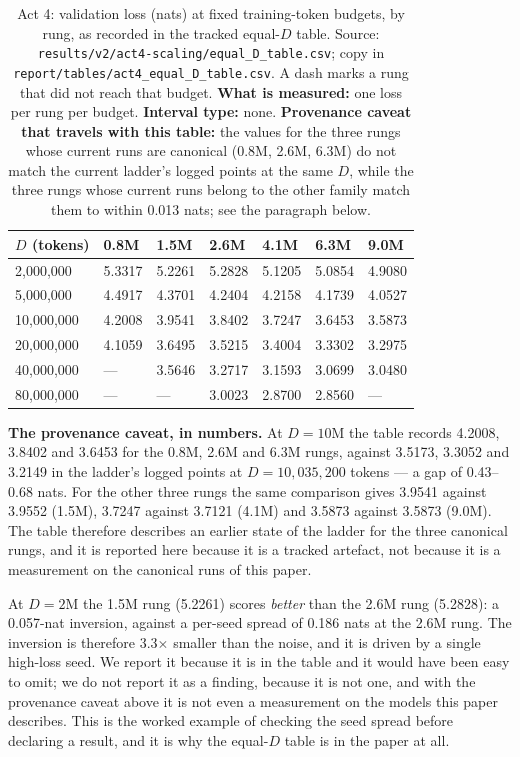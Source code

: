 \documentclass[11pt,a4paper]{article}
\begin{document}
\begin{table}[H]
\centering
\begin{tabular}{L{2.0cm}R{1.8cm}R{1.8cm}R{1.8cm}R{1.8cm}R{1.8cm}R{1.8cm}}
\toprule
$D$ (tokens) & 0.8M & 1.5M & 2.6M & 4.1M & 6.3M & 9.0M \\
,000,000 & 5.3317 & 5.2261 & 5.2828 & 5.1205 & 5.0854 & 4.9080 \\
5,000,000 & 4.4917 & 4.3701 & 4.2404 & 4.2158 & 4.1739 & 4.0527 \\
10,000,000 & 4.2008 & 3.9541 & 3.8402 & 3.7247 & 3.6453 & 3.5873 \\
20,000,000 & 4.1059 & 3.6495 & 3.5215 & 3.4004 & 3.3302 & 3.2975 \\
40,000,000 & --- & 3.5646 & 3.2717 & 3.1593 & 3.0699 & 3.0480 \\
80,000,000 & --- & --- & 3.0023 & 2.8700 & 2.8560 & --- \\
\bottomrule
\end{tabular}
\caption{Act 4: validation loss (nats) at fixed training-token budgets, by rung,
as recorded in the tracked equal-$D$ table. Source:
\texttt{results/v2/act4-scaling/equal\_D\_table.csv}; copy in
\texttt{report/tables/act4\_equal\_D\_table.csv}. A dash marks a rung that did
not reach that budget. \textbf{What is measured:} one loss per rung per
budget. \textbf{Interval type:} none. \textbf{Provenance caveat that travels
with this table:} the values for the three rungs whose current runs are
canonical (0.8M, 2.6M, 6.3M) do not match the current ladder's logged points
at the same $D$, while the three rungs whose current runs belong to the other
family match them to within 0.013 nats; see the paragraph below.}
\label{tab:act4-equalD}
\end{table}

\textbf{The provenance caveat, in numbers.} At $D = 10$M the table records
4.2008, 3.8402 and 3.6453 for the 0.8M, 2.6M and 6.3M rungs, against
3.5173, 3.3052 and 3.2149 in the ladder's logged points at
$D = 10{,}035{,}200$ tokens --- a gap of 0.43--0.68 nats. For the other three
rungs the same comparison gives 3.9541 against 3.9552 (1.5M), 3.7247 against
3.7121 (4.1M) and 3.5873 against 3.5873 (9.0M). The table therefore describes
an earlier state of the ladder for the three canonical rungs, and it is
reported here because it is a tracked artefact, not because it is a
measurement on the canonical runs of this paper. %

At $D = 2$M the 1.5M rung (5.2261) scores \emph{better} than the 2.6M rung
(5.2828): a 0.057-nat inversion, against a per-seed spread of 0.186 nats at the
2.6M rung. The inversion is therefore 3.3$\times$ smaller than the noise, and
it is driven by a single high-loss seed. We report it because it is in the
table and it would have been easy to omit; we do not report it as a finding,
because it is not one, and with the provenance caveat above it is not even a
measurement on the models this paper describes. This is the worked example of
checking the seed spread before declaring a result, and it is why the equal-$D$
table is in the paper at all. %
\end{document}
